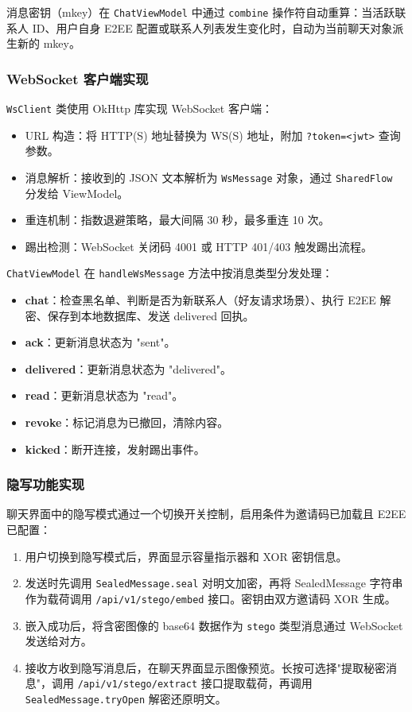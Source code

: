 消息密钥（mkey）在 \texttt{ChatViewModel} 中通过 \texttt{combine} 操作符自动重算：当活跃联系人 ID、用户自身 E2EE 配置或联系人列表发生变化时，自动为当前聊天对象派生新的 mkey。

\subsubsection{WebSocket 客户端实现}

\texttt{WsClient} 类使用 OkHttp 库实现 WebSocket 客户端：

\begin{itemize}
    \item URL 构造：将 HTTP(S) 地址替换为 WS(S) 地址，附加 \texttt{?token=<jwt>} 查询参数。
    \item 消息解析：接收到的 JSON 文本解析为 \texttt{WsMessage} 对象，通过 \texttt{SharedFlow} 分发给 ViewModel。
    \item 重连机制：指数退避策略，最大间隔 30 秒，最多重连 10 次。
    \item 踢出检测：WebSocket 关闭码 4001 或 HTTP 401/403 触发踢出流程。
\end{itemize}

\texttt{ChatViewModel} 在 \texttt{handleWsMessage} 方法中按消息类型分发处理：

\begin{itemize}
    \item \textbf{chat}：检查黑名单、判断是否为新联系人（好友请求场景）、执行 E2EE 解密、保存到本地数据库、发送 delivered 回执。
    \item \textbf{ack}：更新消息状态为 "sent"。
    \item \textbf{delivered}：更新消息状态为 "delivered"。
    \item \textbf{read}：更新消息状态为 "read"。
    \item \textbf{revoke}：标记消息为已撤回，清除内容。
    \item \textbf{kicked}：断开连接，发射踢出事件。
\end{itemize}

\subsubsection{隐写功能实现}

聊天界面中的隐写模式通过一个切换开关控制，启用条件为邀请码已加载且 E2EE 已配置：

\begin{enumerate}
    \item 用户切换到隐写模式后，界面显示容量指示器和 XOR 密钥信息。
    \item 发送时先调用 \texttt{SealedMessage.seal} 对明文加密，再将 SealedMessage 字符串作为载荷调用 \texttt{/api/v1/stego/embed} 接口。密钥由双方邀请码 XOR 生成。
    \item 嵌入成功后，将含密图像的 base64 数据作为 \texttt{stego} 类型消息通过 WebSocket 发送给对方。
    \item 接收方收到隐写消息后，在聊天界面显示图像预览。长按可选择"提取秘密消息"，调用 \texttt{/api/v1/stego/extract} 接口提取载荷，再调用 \texttt{SealedMessage.tryOpen} 解密还原明文。
\end{enumerate}


